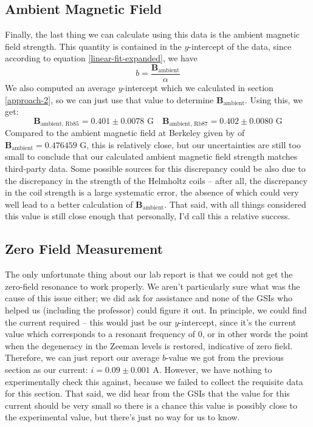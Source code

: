\documentclass[10pt]{article}
\begin{document}
	\subsection{Ambient Magnetic Field}
	Finally, the last thing we can calculate using this data is the ambient magnetic
	field strength. This quantity is contained in the \( y \)-intercept of the data,
	since according to equation \ref{linear-fit-expanded}, we have
	\[
		b = \frac{\mathbf{B}_\text{ambient}}{\alpha}
	\]
	We also computed an average \( y \)-intercept which we calculated in section
	\ref{approach-2}, so we can just use that value to determine \(
	\mathbf{B}_\text{ambient} \). Using this, we get:
	\[
		\mathbf{B}_\text{ambient, Rb85} = 0.401 \pm 0.0078 \text{ G}\quad 
		\mathbf{B}_\text{ambient, Rb87} = 0.402 \pm 0.0080 \text{ G}
	\]
	Compared to the ambient magnetic field at Berkeley given by
	\cite{WorldMagneticModel2020} of \(
	\mathbf{B}_\text{ambient} = 0.476459 \) G, this is relatively close, but our
	uncertainties are still too small to conclude that our calculated ambient
	magnetic field strength matches third-party data. Some possible sources for this
	discrepancy could be also due to the discrepancy in the strength of the Helmholtz
	coils -- after all, the discrepancy in the coil strength is a large systematic
	error, the absence of which could very well lead 
	to a better calculation of \( \mathbf{B}_\text{ambient} \). That said, with all
	things considered this value is still close enough that personally, I'd call this
	a relative success. 

	\subsection{Zero Field Measurement}
	The only unfortunate thing about our lab report is that we could not get the
	zero-field resonance to work properly. We aren't particularly sure what was the
	cause of this issue either; we did ask for assistance and none of the GSIs who
	helped us (including the professor) could figure it out. In principle, we could
	find the current required -- this would just be our \( y \)-intercept, 
	since it's the
	current value which corresponds to a resonant frequency of 0, or in other words
	the point when the degeneracy in the Zeeman levels is restored, indicative of
	zero field. 
	Therefore, we can just report our average \( b \)-value we got from the
	previous section as our current: \( i = 0.09 \pm 0.001 \) A. However, we have
	nothing to experimentally check this against, because we failed to collect the
	requisite data for this section. That said, we did hear from the GSIs that the
	value for this current should be very small so there is a chance this value is
	possibly close to the experimental value, but there's just no way for us to know.    
\end{document}

